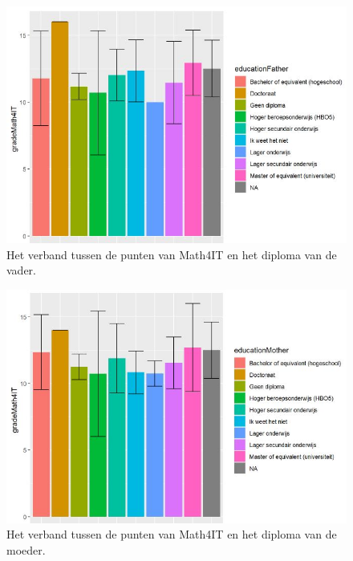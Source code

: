 \documentclass{hogent-article}
\begin{document}
\begin{figure}[h!]
    \includegraphics[width=\linewidth]{gradeMath4IT-EducationFather.JPG}
    \caption{Het verband tussen de punten van Math4IT en het diploma van de vader.}
    \label{fig:gradeMath4IT-EducationFather}
\end{figure}
\begin{figure}[h!]
    \includegraphics[width=\linewidth]{gradeMath4IT-EducationMother.JPG}
    \caption{Het verband tussen de punten van Math4IT en het diploma van de moeder.}
    \label{fig:gradeMath4IT-EducationMother}
\end{figure}
\end{document}
